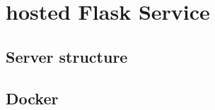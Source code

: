 \chapter{hosted Flask Service}
\label{cha:hosted_flask_service}


\section{Server structure} %


\section{Docker}
